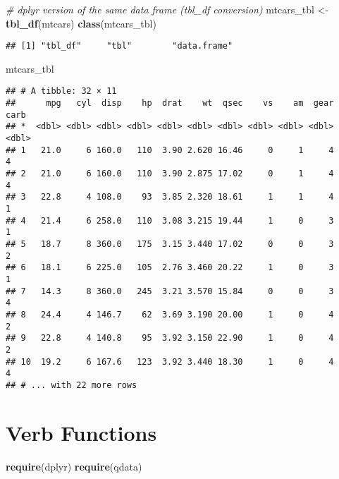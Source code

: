 \documentclass[]{book}
\newenvironment{Shaded}{\begin{snugshade}}{\end{snugshade}}
\newcommand{\KeywordTok}[1]{\textcolor[rgb]{0.13,0.29,0.53}{\textbf{{#1}}}}
\newcommand{\StringTok}[1]{\textcolor[rgb]{0.31,0.60,0.02}{{#1}}}
\newcommand{\CommentTok}[1]{\textcolor[rgb]{0.56,0.35,0.01}{\textit{{#1}}}}
\newcommand{\NormalTok}[1]{{#1}}
\begin{document}
\begin{Shaded}
\begin{Highlighting}[]
\CommentTok{# dplyr version of the same data frame (tbl_df conversion)}
\NormalTok{mtcars_tbl <-}\StringTok{ }\KeywordTok{tbl_df}\NormalTok{(mtcars)}
\KeywordTok{class}\NormalTok{(mtcars_tbl)}
\end{Highlighting}
\end{Shaded}

\begin{verbatim}
## [1] "tbl_df"     "tbl"        "data.frame"
\end{verbatim}

\begin{Shaded}
\begin{Highlighting}[]
\NormalTok{mtcars_tbl}
\end{Highlighting}
\end{Shaded}

\begin{verbatim}
## # A tibble: 32 × 11
##      mpg   cyl  disp    hp  drat    wt  qsec    vs    am  gear  carb
## *  <dbl> <dbl> <dbl> <dbl> <dbl> <dbl> <dbl> <dbl> <dbl> <dbl> <dbl>
## 1   21.0     6 160.0   110  3.90 2.620 16.46     0     1     4     4
## 2   21.0     6 160.0   110  3.90 2.875 17.02     0     1     4     4
## 3   22.8     4 108.0    93  3.85 2.320 18.61     1     1     4     1
## 4   21.4     6 258.0   110  3.08 3.215 19.44     1     0     3     1
## 5   18.7     8 360.0   175  3.15 3.440 17.02     0     0     3     2
## 6   18.1     6 225.0   105  2.76 3.460 20.22     1     0     3     1
## 7   14.3     8 360.0   245  3.21 3.570 15.84     0     0     3     4
## 8   24.4     4 146.7    62  3.69 3.190 20.00     1     0     4     2
## 9   22.8     4 140.8    95  3.92 3.150 22.90     1     0     4     2
## 10  19.2     6 167.6   123  3.92 3.440 18.30     1     0     4     4
## # ... with 22 more rows
\end{verbatim}

\section{Verb Functions}\label{verb-functions}

\begin{Shaded}
\begin{Highlighting}[]
\KeywordTok{require}\NormalTok{(dplyr)}
\KeywordTok{require}\NormalTok{(qdata)}
\end{Highlighting}
\end{Shaded}
\end{document}

